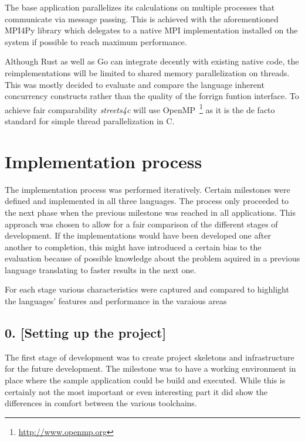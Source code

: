 The base application parallelizes its calculations on multiple processes that communicate via message passing. This is achieved with the aforementioned MPI4Py library which delegates to a native MPI implementation installed on the system if possible to reach maximum performance.

Although Rust as well as Go can integrate decently with existing native code, the reimplementations will be limited to shared memory parallelization on threads. This was mostly decided to evaluate and compare the language inherent concurrency constructs rather than the quality of the forrign funtion interface. To achieve fair comparability \textit{streets4c} will use OpenMP~\footnote{\url{http://www.openmp.org}} as it is the de facto standard for simple thread parallelization in C.

\section{Implementation process}
\label{sec:Approach::Implementation}

The implementation process was performed iteratively. Certain milestones were defined and implemented in all three languages. The process only proceeded to the next phase when the previous milestone was reached in all applications. This approach was chosen to allow for a fair comparison of the different stages of development. If the implementations would have been developed one after another to completion, this might have introduced a certain bias to the evaluation because of possible knowledge about the problem aquired in a previous language translating to faster results in the next one.

For each stage various characteristics were captured and compared to highlight the languages' features and performance in the varaious areas

\subsection*{0. [Setting up the project]}
\label{subsec:Approach::Implementation::Setup}

The first stage of development was to create project skeletons and infrastructure for the future development. The milestone was to have a working environment in place where the sample application could be build and executed. While this is certainly not the most important or even interesting part it did show the differences in comfort between the various toolchains.

